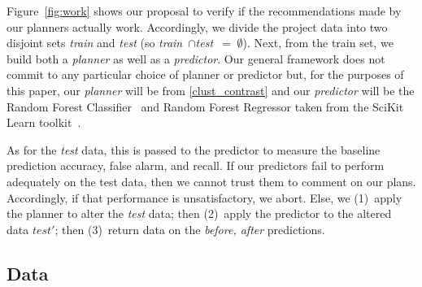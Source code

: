 \documentclass{sig-alternate}
\newcommand{\fig}[1]{Figure~\ref{fig:#1}}
\begin{document}
\fig{work} shows our proposal to verify if the recommendations made by our planners actually work. Accordingly, we divide the
project data  into two disjoint sets {\em train} and {\em test}
(so \mbox{{\em train} $\cap ${\em test} $=\;\emptyset$}).
Next, from the train set, we build both a {\em planner} as well
as a {\em  predictor}. Our general framework does not   commit to any particular choice of { planner} or { predictor} but, for the purposes of this paper, our {\em planner} will be from \ref{clust_contrast} and our {\em predictor} will be the Random Forest Classifier~\cite{Breiman2001} and Random Forest Regressor taken from the SciKit Learn toolkit~\cite{Pedregosa2012}.  

As for the {\em test} data, this is passed to the { predictor}
to measure the baseline prediction accuracy, false alarm, and recall.
If our { predictors} fail to perform adequately on the test data,
then we cannot trust them to comment on our plans. Accordingly,
if that performance is unsatisfactory, we abort.
Else, we (1)~apply the { planner} to alter the {\em test} data;
then (2)~apply the { predictor} to the altered data $test'$;
then (3)~return data on the {\em before, after} predictions.

\subsection{Data}






\end{document}

